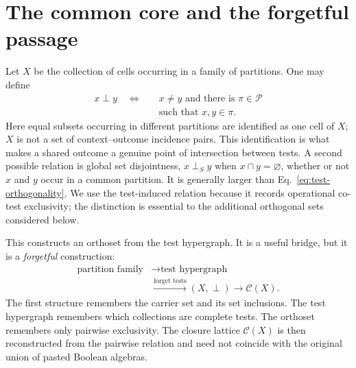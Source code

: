 \documentclass[
  aps,
  pra,
  twocolumn,
  amsmath,
  amssymb,
  longbibliography,
  nofootinbib,
  floatfix
]{revtex4-2}
\newcommand{\cP}{\mathcal P}
\newcommand{\cC}{\mathcal C}
\begin{document}
\section{The common core and the forgetful passage}
\label{sec:common-core}

Let $X$ be the collection of cells occurring in a family of partitions.  One
may define
\begin{equation}
\begin{aligned}
  x\perp y\quad\Longleftrightarrow\quad
  &x\ne y\text{ and there is }\pi\in\cP\\
  &\text{such that }x,y\in\pi.
\end{aligned}
  \label{eq:test-orthogonality}
\end{equation}
Here equal subsets occurring in different partitions are identified as one
cell of $X$; $X$ is not a set of context--outcome incidence pairs.  This
identification is what makes a shared outcome a genuine point of intersection
between tests.  A second possible relation is global set disjointness,
$x\perp_S y$ when $x\cap y=\varnothing$, whether or not $x$ and $y$ occur in a
common partition.  It is generally larger than
Eq.~\eqref{eq:test-orthogonality}.  We use the test-induced relation because it
records operational co-test exclusivity; the distinction is essential to the
additional orthogonal sets considered below.

This constructs an orthoset from the test hypergraph.  It is a useful bridge,
but it is a \emph{forgetful} construction:
\begin{equation}
\begin{aligned}
\text{partition family}&\longrightarrow\text{test hypergraph}\\
&\xrightarrow{\text{forget tests}}(X,\perp)
\longrightarrow\cC(X).
\end{aligned}
\label{eq:forgetful-chain}
\end{equation}
The first structure remembers the carrier set and its set inclusions.  The test
hypergraph remembers which collections are complete tests.  The orthoset
remembers only pairwise exclusivity.  The closure lattice $\cC(X)$ is then
reconstructed from the pairwise relation and need not coincide with the
original union of pasted Boolean algebras.
\end{document}
